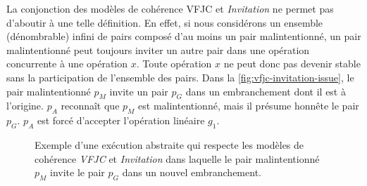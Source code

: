 La conjonction des modèles de cohérence \acs{VFJC} et \emph{Invitation} ne permet pas d'aboutir à une telle définition.
En effet, si nous considérons un ensemble (dénombrable) infini de pairs composé d'au moins un pair malintentionné, un pair malintentionné peut toujours inviter un autre pair dans une opération concurrente à une opération $x$.
Toute opération $x$ ne peut donc pas devenir stable sans la participation de l'ensemble des pairs.
Dans la \autoref{fig:vfjc-invitation-issue}, le pair malintentionné $p_M$ invite un pair $p_G$ dans un embranchement dont il est à l'origine.
$p_A$ reconnaît que $p_M$ est malintentionné, mais il présume honnête le pair $p_G$.
$p_A$ est forcé d'accepter l'opération linéaire $g_1$.

\begin{figure}[htb]
\centering
{}
\caption[Exécution abstraite qui respecte les modèles de cohérence \emph{VFJC} et \emph{Invitation}]{Exemple  d'une exécution abstraite qui respecte les modèles de cohérence \emph{VFJC} et \emph{Invitation} dans laquelle le pair malintentionné $p_M$ invite le pair $p_G$ dans un nouvel embranchement.}\label{fig:vfjc-invitation-issue}
\end{figure}

